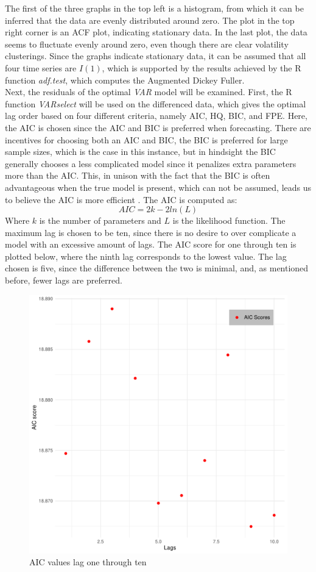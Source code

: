 \noindent The first of the three graphs in the top left is a histogram, from which it can be inferred that the data are evenly distributed around zero. The plot in the top right corner is an ACF plot, indicating stationary data. In the last plot, the data seems to fluctuate evenly around zero, even though there are clear volatility clusterings. 
Since the graphs indicate stationary data, it can be assumed that all four time series are $I(1)$, which is supported by the results achieved by the R function \textit{adf.test}, which computes the Augmented Dickey Fuller.\\

\noindent Next, the residuals of the optimal \textit{VAR} model will be examined. First, the R function \textit{VARselect} will be used on the differenced data, which gives the optimal lag order based on four different criteria, namely AIC, HQ, BIC, and FPE. 
Here, the AIC is chosen since the AIC and BIC is preferred when forecasting. There are incentives for choosing both an AIC and BIC, the BIC is preferred for large sample sizes, which is the case in this instance, but in hindsight the BIC generally chooses a less complicated model since it penalizes extra parameters more than the AIC. This, in unison with the fact that the BIC is often advantageous when the true model is present, which can not be assumed, leads us to believe the AIC is more efficient \cite{AICorBIC}. The AIC is computed as:
\begin{equation*}
    AIC=2k-2ln(L)
\end{equation*}
Where $k$ is the number of parameters and $L$ is the likelihood function. The maximum lag is chosen to be ten, since there is no desire to over complicate a model with an excessive amount of lags. The AIC score for one through ten is plotted below, where the ninth lag corresponds to the lowest value. The lag chosen is five, since the difference between the two is minimal, and, as mentioned before, fewer lags are preferred.
\begin{figure}[H]
    \centering
    \includegraphics[width=0.5\linewidth]{1.Projekt_kode/Billeder/Crypto_lags.pdf}
    \caption{AIC values lag one through ten}
\end{figure}
